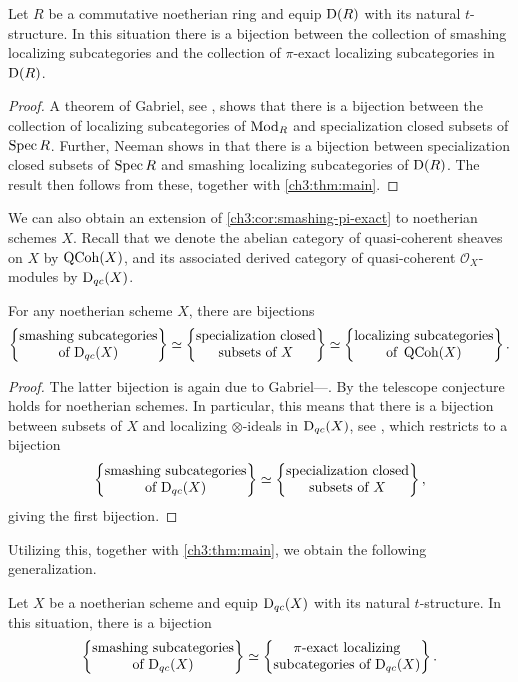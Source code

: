 \begin{corollary}
    \label{ch3:cor:smashing-pi-exact}
    Let $R$ be a commutative noetherian ring and equip $\mathrm{D}(R)$ with its natural $t$-structure. In this situation there is a bijection between the collection of smashing localizing subcategories and the collection of $\pi$-exact localizing subcategories in $\mathrm{D}(R)$. 
\end{corollary}
\begin{proof}
    A theorem of Gabriel, see \cite[VI.2.4(b)]{gabriel_1962}, shows that there is a bijection between the collection of localizing subcategories of $\mathrm{Mod}_R$ and specialization closed subsets of $\operatorname{Spec} R$. Further, Neeman shows in \cite[3.3]{neeman_bokstedt_1992} that there is a bijection between specialization closed subsets of $\operatorname{Spec} R$ and smashing localizing subcategories of $\mathrm{D}(R)$. The result then follows from these, together with \cref{ch3:thm:main}. 
\end{proof}

We can also obtain an extension of \cref{ch3:cor:smashing-pi-exact} to noetherian schemes $X$. Recall that we denote the abelian category of quasi-coherent sheaves on $X$ by $\operatorname{QCoh}(X)$, and its associated derived category of quasi-coherent $\mathcal{O}_X$-modules by $\mathrm{D}_{qc}(X)$. 

\begin{lemma}
    For any noetherian scheme $X$, there are bijections
    \[\left\{ \begin{matrix} \text{smashing subcategories}\\ \text{of }\mathrm{D}_{qc}(X) \end{matrix} \right\}\simeq \left\{ \begin{matrix} \text{specialization closed}\\ \text{subsets of }X \end{matrix} \right\} \simeq \left\{ \begin{matrix} \text{localizing subcategories}\\ \text{of }\operatorname{QCoh}(X) \end{matrix} \right\}.\]
\end{lemma}
\begin{proof}
    The latter bijection is again due to Gabriel---\cite[VI.2.4(b)]{gabriel_1962}. By \cite[4.13]{tarrio-lopez-salorio_2004} the telescope conjecture holds for noetherian schemes. In particular, this means that there is a bijection between subsets of $X$ and localizing $\otimes$-ideals in $\mathrm{D}_{qc}(X)$, see \cite[8.13]{stevenson_2013}, which restricts to a bijection
    \[\left\{ \begin{matrix} \text{smashing subcategories}\\ \text{of }\mathrm{D}_{qc}(X) \end{matrix} \right\}\simeq \left\{ \begin{matrix} \text{specialization closed}\\ \text{subsets of }X \end{matrix} \right\},\]
    giving the first bijection. 
\end{proof}

Utilizing this, together with \cref{ch3:thm:main}, we obtain the following generalization. 

\begin{corollary}
    Let $X$ be a noetherian scheme and equip $\mathrm{D}_{qc}(X)$ with its natural $t$-structure. In this situation, there is a bijection
    \[\left\{ \begin{matrix} \text{smashing subcategories}\\ \text{of }\mathrm{D}_{qc}(X) \end{matrix} \right\} \simeq \left\{ \begin{matrix} \pi\text{-exact localizing}\\ \text{subcategories of }\mathrm{D}_{qc}(X) \end{matrix} \right\}.\]
\end{corollary}


